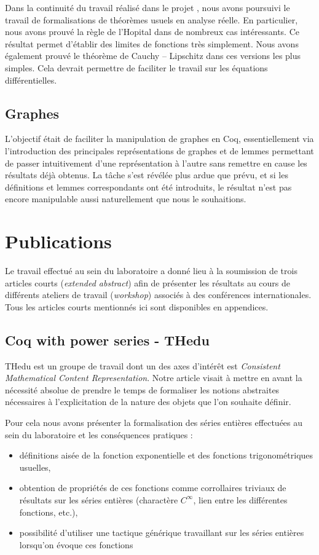 \documentclass[11pt]{article}
\begin{document}
Dans la continuité du travail réalisé dans le projet \coquille{}, nous avons
poursuivi le travail de formalisations de théorèmes usuels en analyse réelle.
En particulier, nous avons prouvé la règle de l'Hopital dans de nombreux cas
intéressants. Ce résultat permet d'établir des limites de fonctions très simplement.
Nous avons également prouvé le théorème de Cauchy -- Lipschitz dans ces versions les
plus simples. Cela devrait permettre de faciliter le travail sur les équations
différentielles.

\subsection{Graphes}

L'objectif était de faciliter la manipulation de graphes en Coq, essentiellement via l'introduction des principales représentations de graphes et de lemmes permettant de passer intuitivement d'une représentation à l'autre sans remettre en cause les résultats déjà obtenus. La tâche s'est révélée plus ardue que prévu, et si les définitions et lemmes correspondants ont été introduits, le résultat n'est pas encore manipulable aussi naturellement que nous le souhaitions.

\section{Publications}

Le travail effectué au sein du laboratoire \coqtail{} a donné lieu à la soumission
de trois articles courts (\textit{extended abstract}) afin de présenter les résultats
au cours de différents ateliers de travail (\textit{workshop}) associés à des
conférences internationales. Tous les articles courts mentionnés ici sont disponibles
en appendices.

\subsection{Coq with power series - THedu}

THedu est un groupe de travail dont un des axes d'intérêt est \textit{Consistent
Mathematical Content Representation}. Notre article visait à mettre en avant la
nécessité absolue de prendre le temps de formaliser les notions abstraites nécessaires
à l'explicitation de la nature des objets que l'on souhaite définir.

Pour cela nous avons présenter la formalisation des séries entières effectuées au
sein du laboratoire et les conséquences pratiques :
\begin{itemize}
 \item définitions aisée de la fonction exponentielle et des fonctions
 trigonométriques usuelles,
 \item obtention de propriétés de ces fonctions comme corrollaires triviaux
 de résultats sur les séries entières (charactère $C^{\infty}$, lien entre les
 différentes fonctions, etc.),
 \item possibilité d'utiliser une tactique générique travaillant sur les séries
 entières lorsqu'on évoque ces fonctions
\end{itemize}
\end{document}
